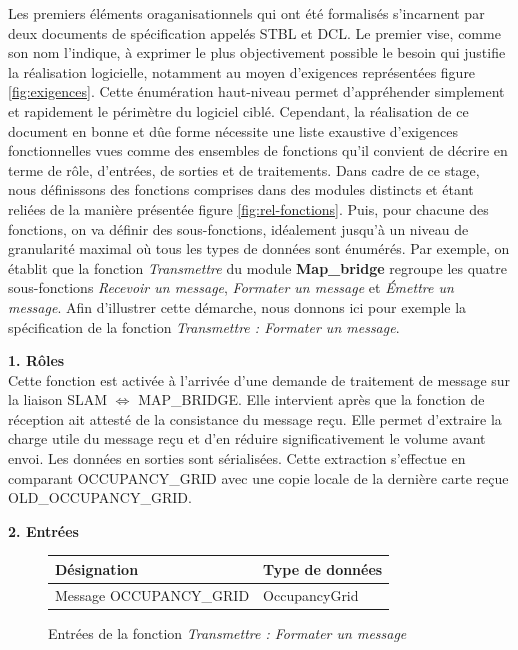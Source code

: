   Les premiers éléments oraganisationnels qui ont été formalisés s'incarnent par deux documents de spécification appelés \gls{STBL} et \gls{DCL}.
  Le premier vise, comme son nom l'indique, à exprimer le plus objectivement possible le besoin qui justifie la réalisation logicielle, notamment au moyen d'exigences représentées figure \ref{fig:exigences}. 
  Cette énumération haut-niveau permet d'appréhender simplement et rapidement le périmètre du logiciel ciblé. 
  Cependant, la réalisation de ce document en bonne et dûe forme nécessite une liste exaustive d'exigences fonctionnelles vues comme des ensembles de fonctions qu'il convient de décrire en terme de rôle, d'entrées, de sorties et
  de traitements. 
  Dans cadre de ce stage, nous définissons des fonctions comprises dans des modules distincts et étant reliées de la manière présentée figure \ref{fig:rel-fonctions}.
  Puis, pour chacune des fonctions, on va définir des sous-fonctions, idéalement jusqu'à un niveau de granularité maximal où tous les types de données sont énumérés. 
  Par exemple, on établit que la fonction \emph{Transmettre} du module \textbf{\textcolor{red-stbl}{Map\_bridge}} regroupe les quatre sous-fonctions \emph{Recevoir un message}, \emph{Formater un message} et \emph{\'{E}mettre un message}. 
  Afin d'illustrer cette démarche, nous donnons ici pour exemple la spécification de la fonction \emph{Transmettre : Formater un message}. 
  
  \textbf{1. Rôles } \\
  Cette fonction est activée à l’arrivée d’une demande de traitement de message sur la liaison SLAM $\Longleftrightarrow{}$ MAP\_BRIDGE.
  Elle intervient après que la fonction de réception ait attesté de la consistance du message reçu.
  Elle permet d’extraire la charge utile du message reçu et d’en réduire significativement le volume avant envoi.  Les données en sorties sont sérialisées.
  Cette extraction s’effectue en comparant OCCUPANCY\_GRID avec une copie locale de la dernière carte reçue OLD\_OCCUPANCY\_GRID.
  
  \textbf{2. Entrées }
  \begin{figure}[!h]
    \begin{center}
      \begin{tabular}{|l|l|}
	\hline
	\textbf{Désignation} & \textbf{Type de données} \\
	\hline
	Message OCCUPANCY\_GRID & OccupancyGrid \\
	\hline
      \end{tabular}
    \end{center}
    \caption{Entrées de la fonction \emph{Transmettre : Formater un message}}
  \end{figure}
  
